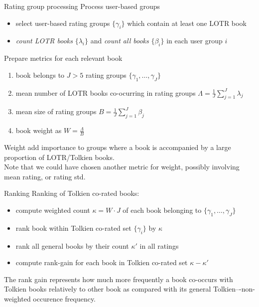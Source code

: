 \documentclass[9pt]{beamer}
\begin{document}
\begin{frame}{Rating group processing}
	Process user-based groups
	\begin{itemize}
		\item select user-based rating groups $\{\gamma_i\}$ which contain at least one LOTR book
		\item \emph{count LOTR books} $\{\lambda_i\}$ and \emph{count all books} $\{\beta_i\}$ in each user group $i$ 
	\end{itemize}
	Prepare metrics for each relevant book
	\begin{enumerate}
		\item book belongs to $J>5$ rating groups $\{\gamma_1,\ldots,\gamma_J\}$ 
		\item mean number of LOTR books co-ocurring in rating groups $\Lambda =\frac{1}{J}\sum_{j=1}^{J} \lambda_j $
		\item mean size of rating groups $B = \frac{1}{J}\sum_{j=1}^J \beta_j$
		\item book weight as $W = \frac{\Lambda}{B}$
	\end{enumerate}
	Weight add importance to groups where a book is accompanied by a large proportion of LOTR/Tolkien books.\\
	Note that we could have chosen another metric for weight, possibly involving mean rating, or rating std.
\end{frame}

\begin{frame}{Ranking}
	Ranking of Tolkien co-rated books:\\
	\begin{itemize}
		\item compute weighted count $\kappa=W\cdot J$ of each book belonging to $\{\gamma_1,\ldots,\gamma_J\}$
		\item rank book within Tolkien co-rated set $\{\gamma_i\}$ by $\kappa$
		\item rank all general books by their count $\kappa'$ in all ratings
		\item compute rank-gain for each book in Tolkien co-rated set $\kappa - \kappa'$ 
	\end{itemize}
	The rank gain represents how much more frequently a book co-occurs with Tolkien books relatively to other book as compared with its general Tolkien–-non-weighted occurence frequency.
\end{frame}
\end{document}
